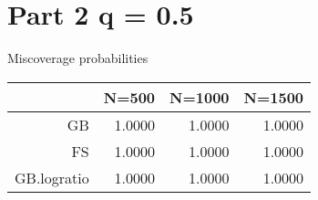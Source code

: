 \section*{Part 2 q = 0.5}


Miscoverage probabilities

\begin{tabular}{rrrr}
  \hline
 & N=500 & N=1000 & N=1500 \\ 
  \hline
GB & 1.0000 & 1.0000 & 1.0000 \\ 
  FS & 1.0000 & 1.0000 & 1.0000 \\ 
  GB.logratio & 1.0000 & 1.0000 & 1.0000 \\ 
   \hline
\end{tabular}
\vspace{0.2in}
